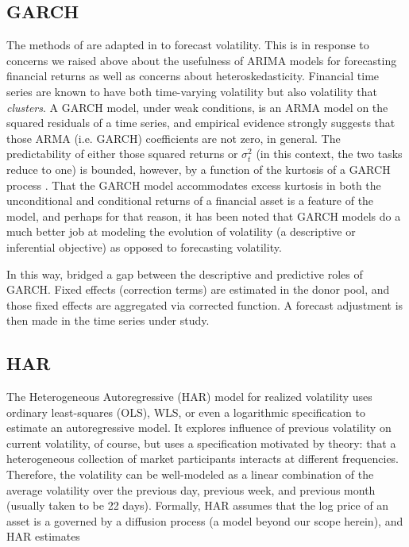 \documentclass[11pt]{article}
\theoremstyle{definition}
\begin{document}
\subsection{GARCH}
The methods of \cite{lin2021minimizing} are adapted in \cite{lundquist2024volatility} to forecast volatility.  This is in response to concerns we raised above about the usefulness of ARIMA models for forecasting financial returns as well as concerns about heteroskedasticity.  Financial time series are known to have both time-varying volatility but also volatility that \textit{clusters}.  A GARCH model, under weak conditions, is an ARMA model on the squared residuals of a time series, and empirical evidence strongly suggests that those ARMA (i.e. GARCH) coefficients are not zero, in general.  The predictability of either those squared returns or $\sigma_{t}^{2}$ (in this context, the two tasks reduce to one) is bounded, however, by a function of the kurtosis of a GARCH process \citep{francq2019garch}.  That the GARCH model accommodates excess kurtosis in both the unconditional and conditional returns of a financial asset is a feature of the model, and perhaps for that reason, it has been noted that GARCH models do a much better job at modeling the evolution of volatility (a descriptive or inferential objective) as opposed to forecasting volatility.

In this way, \cite{lundquist2024volatility} bridged a gap between the descriptive and predictive roles of GARCH.  Fixed effects (correction terms) are estimated in the donor pool, and those fixed effects are aggregated via corrected function.  A forecast adjustment is then made in the time series under study.

\subsection{HAR}

The Heterogeneous Autoregressive (HAR) model for realized volatility \citep{corsi2009simple}  uses ordinary least-squares (OLS), WLS, or even a logarithmic specification to estimate an autoregressive model.  It explores influence of previous volatility on current volatility, of course, but uses a specification motivated by theory: that a heterogeneous collection of market participants interacts at different frequencies.  Therefore, the volatility can be well-modeled as a linear combination of the average volatility over the previous day, previous week, and previous month (usually taken to be 22 days).  Formally, HAR assumes that the log price of an asset is a governed by a diffusion process (a model beyond our scope herein), and HAR estimates
\end{document}
